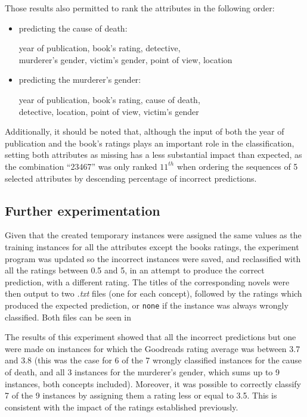 \documentclass{mproj}
\begin{document}
Those results also permitted to rank the attributes in the following order:
\begin{itemize}[topsep=0pt]
	\item predicting the cause of death:
	\begin{center}
		year of publication, book's rating, detective, \\
		murderer's gender, victim's gender, point of view, location
	\end{center}
	\item predicting the murderer's gender:
	\begin{center}
		year of publication, book's rating, cause of death, \\
		detective, location, point of view, victim's gender
	\end{center}	
\end{itemize}

Additionally, it should be noted that, although the input of both the year of publication and the book's ratings plays an important role in the classification, setting both attributes as missing has a less substantial impact than expected, as the combination ``23467'' was only ranked $11^{th}$ when ordering the sequences of 5 selected attributes by descending percentage of incorrect predictions.

\subsection*{Further experimentation} \label{experiment}

Given that the created temporary instances were assigned the same values as the training instances for all the attributes except the books ratings, the experiment program was updated so the incorrect instances were saved, and reclassified with all the ratings between 0.5 and 5, in an attempt to produce the correct prediction, with a different rating. The titles of the corresponding novels were then output to two \textit{.txt} files (one for each concept), followed by the ratings which produced the expected prediction, or \verb|none| if the instance was always wrongly classified. Both files can be seen in 

The results of this experiment showed that all the incorrect predictions but one were made on instances for which the Goodreads rating average was between 3.7 and 3.8 (this was the case for 6 of the 7 wrongly classified instances for the cause of death, and all 3 instances for the murderer's gender, which sums up to 9 instances, both concepts included). Moreover, it was possible to correctly classify 7 of the 9 instances by assigning them a rating less or equal to 3.5. This is consistent with the impact of the ratings established previously.
\end{document}
